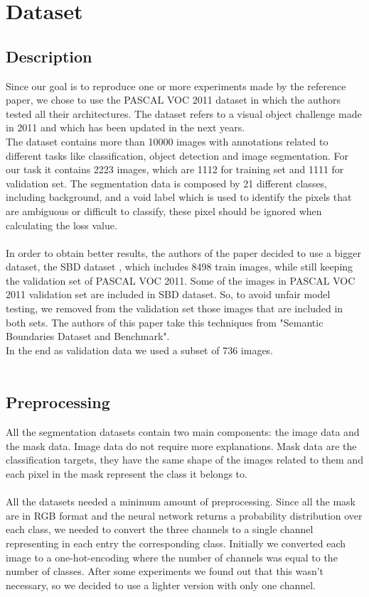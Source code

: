 \documentclass[10pt,twocolumn,letterpaper]{article}
\begin{document}
\section{Dataset}
\subsection{Description}
Since our goal is to reproduce one or more experiments made by the reference paper\cite{projectPaper}, we chose to use the PASCAL VOC 2011\cite{pascal-voc-2011} dataset in which the authors tested all their architectures.
The dataset refers to a visual object challenge made in 2011 and which has been updated in the next years. \\
The dataset contains more than 10000 images with annotations related to different tasks like classification, object detection and image segmentation.
For our task it contains 2223 images, which are 1112 for training set and 1111 for validation set.
The segmentation data is composed by 21 different classes, including background, and a void label which is used to identify the pixels that are ambiguous or difficult to classify, these pixel should be ignored when calculating the loss value. \\ \\
In order to obtain better results, the authors of the paper decided to use a bigger dataset, the SBD dataset \cite{dataset}, which includes 8498 train images, while still keeping the validation set of PASCAL VOC 2011. Some of the images in PASCAL VOC 2011 validation set  are included in SBD dataset. So, to avoid unfair model testing, we removed from the validation set those images that are included in both sets. The authors of this paper take this techniques from "Semantic Boundaries Dataset and Benchmark"\cite{BharathICCV2011}. \\
In the end as validation data we used a subset of 736 images.  \\ \\
\subsection{Preprocessing}
All the segmentation datasets contain two main components: the image data and the mask data. Image data do not require more explanations. Mask data are the classification targets, they have the same shape of the images related to them and each pixel in the mask represent the class it belongs to.
\\ \\
All the datasets needed a minimum amount of preprocessing.
Since all the mask are in RGB format and the neural network returns a probability distribution over each class, we needed to convert the three channels to a single channel representing in each entry the corresponding class. Initially we converted each image to a one-hot-encoding where the number of channels was equal to the number of classes. After some experiments we found out that this wasn't necessary, so we decided to use a lighter version with only one channel. \\
\end{document}
